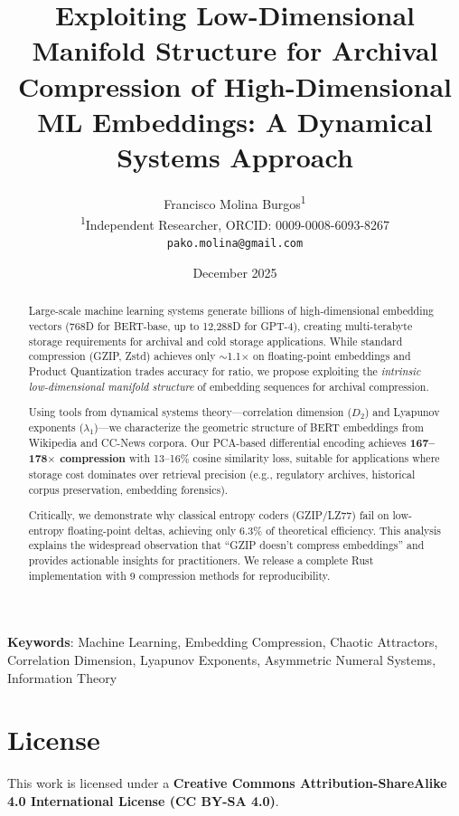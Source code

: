 \documentclass[11pt,a4paper]{article}
\title{Exploiting Low-Dimensional Manifold Structure for Archival Compression of High-Dimensional ML Embeddings: A Dynamical Systems Approach}
\author{
    Francisco Molina Burgos\textsuperscript{1}\\
    \small \textsuperscript{1}Independent Researcher, ORCID: 0009-0008-6093-8267\\
    \small \texttt{pako.molina@gmail.com}
}
\date{December 2025}
\begin{document}
\maketitle

\begin{abstract}
Large-scale machine learning systems generate billions of high-dimensional embedding vectors (768D for BERT-base, up to 12,288D for GPT-4), creating multi-terabyte storage requirements for archival and cold storage applications. While standard compression (GZIP, Zstd) achieves only $\sim$1.1$\times$ on floating-point embeddings and Product Quantization trades accuracy for ratio, we propose exploiting the \textit{intrinsic low-dimensional manifold structure} of embedding sequences for archival compression.

Using tools from dynamical systems theory---correlation dimension ($D_2$) and Lyapunov exponents ($\lambda_1$)---we characterize the geometric structure of BERT embeddings from Wikipedia and CC-News corpora. Our PCA-based differential encoding achieves \textbf{167--178$\times$ compression} with 13--16\% cosine similarity loss, suitable for applications where storage cost dominates over retrieval precision (e.g., regulatory archives, historical corpus preservation, embedding forensics).

Critically, we demonstrate why classical entropy coders (GZIP/LZ77) fail on low-entropy floating-point deltas, achieving only 6.3\% of theoretical efficiency. This analysis explains the widespread observation that ``GZIP doesn't compress embeddings'' and provides actionable insights for practitioners. We release a complete Rust implementation with 9 compression methods for reproducibility.
\end{abstract}

\noindent\textbf{Keywords}: Machine Learning, Embedding Compression, Chaotic Attractors, Correlation Dimension, Lyapunov Exponents, Asymmetric Numeral Systems, Information Theory

\vspace{0.5em}

\noindent\hrulefill

\section*{License}

This work is licensed under a \textbf{Creative Commons Attribution-ShareAlike 4.0 International License (CC BY-SA 4.0)}.
\end{document}
